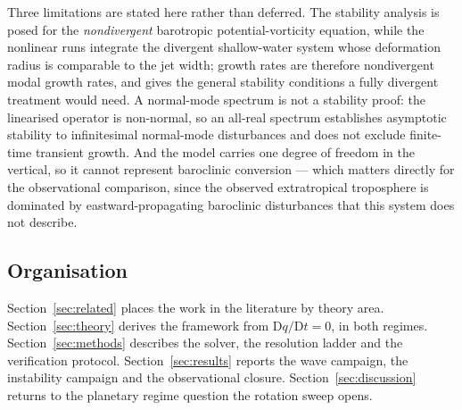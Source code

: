 Three limitations are stated here rather than deferred. The stability analysis is
posed for the \emph{nondivergent} barotropic potential-vorticity equation, while
the nonlinear runs integrate the divergent shallow-water system whose deformation
radius is comparable to the jet width; growth rates are therefore nondivergent
modal growth rates, and \citet{ripa1983} gives the general stability conditions a
fully divergent treatment would need. A normal-mode spectrum is not a stability
proof: the linearised operator is non-normal, so an all-real spectrum establishes
asymptotic stability to infinitesimal normal-mode disturbances and does not
exclude finite-time transient growth. And the model carries one degree of freedom
in the vertical, so it cannot represent baroclinic conversion --- which matters
directly for the observational comparison, since the observed extratropical
troposphere is dominated by eastward-propagating baroclinic disturbances that this
system does not describe.

\subsection{Organisation}

Section~\ref{sec:related} places the work in the literature by theory area.
Section~\ref{sec:theory} derives the framework from
$\mathrm{D}q/\mathrm{D}t = 0$, in both regimes. Section~\ref{sec:methods} describes
the solver, the resolution ladder and the verification protocol.
Section~\ref{sec:results} reports the wave campaign, the instability campaign and
the observational closure. Section~\ref{sec:discussion} returns to the planetary
regime question the rotation sweep opens.
